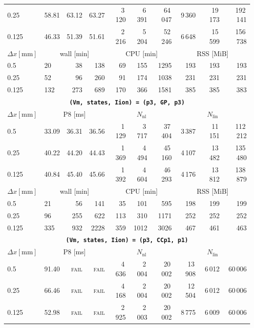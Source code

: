 \documentclass[11pt,a4paper]{article}
\newcommand{\code}[1]{\texttt{\small #1}}
\begin{document}
\begin{center}
\begin{longtable}{l|lrr|rrr|rrr}
0.25 & 58.81 & 63.12 & 63.27 & 3\,120 & 6\,391 & 64\,047 & 9\,360 & 19\,173 & 192\,141\\
0.125 & 46.33 & 51.39 & 51.61 & 2\,216 & 5\,204 & 52\,246 & 6\,648 & 15\,599 & 156\,738\\
\hline
$ \Delta x [\text{mm}] $ & \multicolumn{3}{c|}{wall [min]} & \multicolumn{3}{c|}{CPU [min]} & \multicolumn{3}{c|}{RSS [MiB]}\\
0.5 & 20 & 38 & 138 & 69 & 155 & 1295 & 193 & 193 & 193\\
0.25 & 52 & 96 & 260 & 91 & 174 & 1038 & 231 & 231 & 231\\
0.125 & 132 & 273 & 689 & 170 & 366 & 1581 & 385 & 385 & 383\\
\hline
\hline
\multicolumn{10}{c}{\textbf{\code{(Vm, states, Iion) = (p3, GP, p3)}}}\\\hline
$ \Delta x [\text{mm}] $ & \multicolumn{3}{c|}{P8 [ms]} & \multicolumn{3}{c|}{$N_{\mathrm{nl}}$} & \multicolumn{3}{c|}{$N_{\mathrm{lin}}$}\\
0.5 & 33.09 & 36.31 & 36.56 & 1\,129 & 3\,717 & 37\,404 & 3\,387 & 11\,151 & 112\,212\\
0.25 & 40.22 & 44.20 & 44.43 & 1\,369 & 4\,494 & 45\,160 & 4\,107 & 13\,482 & 135\,480\\
0.125 & 40.84 & 45.40 & 45.66 & 1\,392 & 4\,604 & 46\,293 & 4\,176 & 13\,812 & 138\,879\\
\hline
$ \Delta x [\text{mm}] $ & \multicolumn{3}{c|}{wall [min]} & \multicolumn{3}{c|}{CPU [min]} & \multicolumn{3}{c|}{RSS [MiB]}\\
0.5 & 21 & 56 & 141 & 35 & 101 & 595 & 198 & 199 & 199\\
0.25 & 96 & 255 & 622 & 113 & 310 & 1171 & 252 & 252 & 252\\
0.125 & 335 & 932 & 2228 & 359 & 1012 & 3026 & 467 & 461 & 463\\
\hline
\hline
\multicolumn{10}{c}{\textbf{\code{(Vm, states, Iion) = (p3, CCp1, p1)}}}\\\hline
$ \Delta x [\text{mm}] $ & \multicolumn{3}{c|}{P8 [ms]} & \multicolumn{3}{c|}{$N_{\mathrm{nl}}$} & \multicolumn{3}{c|}{$N_{\mathrm{lin}}$}\\
0.5 & 91.40 & \textsc{fail} & \textsc{fail} & 4\,636 & 2\,004 & 20\,002 & 13\,908 & 6\,012 & 60\,006\\
0.25 & 66.46 & \textsc{fail} & \textsc{fail} & 4\,168 & 2\,004 & 20\,002 & 12\,504 & 6\,012 & 60\,006\\
0.125 & 52.98 & \textsc{fail} & \textsc{fail} & 2\,925 & 2\,003 & 20\,002 & 8\,775 & 6\,009 & 60\,006\\

\end{longtable}
\end{center}
\end{document}
